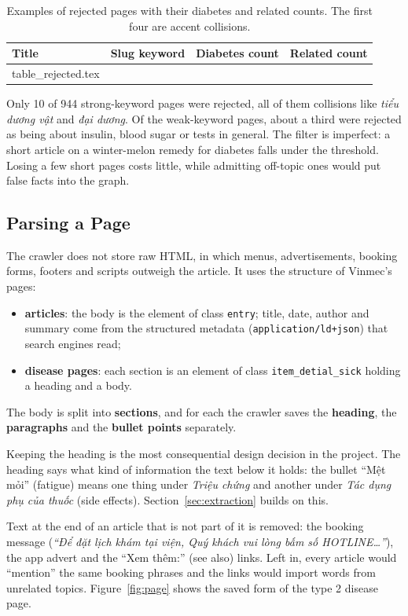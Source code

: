 \documentclass[11pt, a4paper]{article}
\makeatletter
\newcommand{\tabinput}[1]{\@@input #1 }   %
\newcommand{\code}[1]{\texttt{#1}}
\makeatother
\begin{document}
\begin{table}[H]
\centering
\small
\caption{Examples of rejected pages with their diabetes and related counts. The first four are accent collisions.}
\label{tab:rejected}
\begin{tabularx}{\textwidth}{X l r r}
\toprule
Title & Slug keyword & Diabetes count & Related count \\
\midrule
\tabinput{table_rejected.tex}
\bottomrule
\end{tabularx}
\end{table}

Only 10 of 944 strong-keyword pages were rejected, all of them collisions like \emph{tiểu dương vật} and \emph{đại dương}. Of the weak-keyword pages, about a third were rejected as being about insulin, blood sugar or tests in general. The filter is imperfect: a short article on a winter-melon remedy for diabetes falls under the threshold. Losing a few short pages costs little, while admitting off-topic ones would put false facts into the graph.

\subsection{Parsing a Page}

The crawler does not store raw HTML, in which menus, advertisements, booking forms, footers and scripts outweigh the article. It uses the structure of Vinmec's pages:
\begin{itemize}
    \item \textbf{articles}: the body is the element of class \code{entry}; title, date, author and summary come from the structured metadata (\code{application/ld+json}) that search engines read;
    \item \textbf{disease pages}: each section is an element of class \code{item\_detial\_sick} holding a heading and a body.
\end{itemize}
The body is split into \textbf{sections}, and for each the crawler saves the \textbf{heading}, the \textbf{paragraphs} and the \textbf{bullet points} separately.

Keeping the heading is the most consequential design decision in the project. The heading says what kind of information the text below it holds: the bullet ``Mệt mỏi'' (fatigue) means one thing under \emph{Triệu chứng} and another under \emph{Tác dụng phụ của thuốc} (side effects). Section~\ref{sec:extraction} builds on this.

Text at the end of an article that is not part of it is removed: the booking message (\emph{``Để đặt lịch khám tại viện, Quý khách vui lòng bấm số HOTLINE\ldots''}), the app advert and the ``Xem thêm:'' (see also) links. Left in, every article would ``mention'' the same booking phrases and the links would import words from unrelated topics. Figure~\ref{fig:page} shows the saved form of the type 2 disease page.
\end{document}
